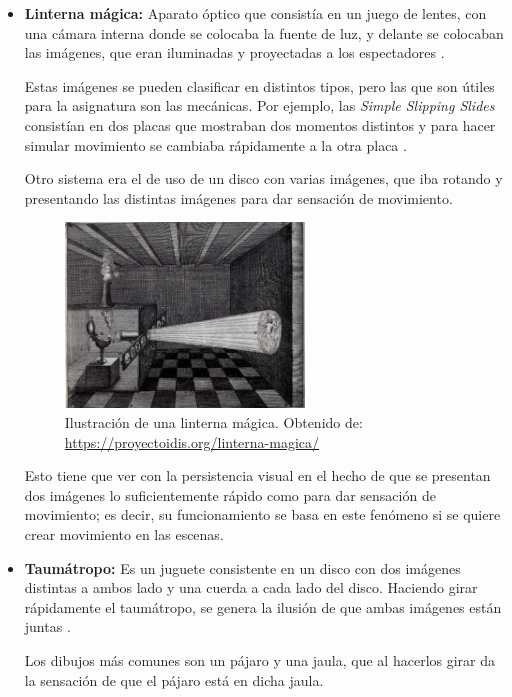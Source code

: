 \documentclass{article}
\begin{document}
\begin{itemize}
    \item \textbf{Linterna mágica: }Aparato óptico que consistía en un juego de lentes, con una cámara interna donde se colocaba la fuente de luz, y delante se colocaban las imágenes, que eran iluminadas y proyectadas a los espectadores \cite{magiclantern}.
    
    Estas imágenes se pueden clasificar en distintos tipos, pero las que son útiles para la asignatura son las mecánicas. Por ejemplo, las \textit{Simple Slipping Slides} consistían en dos placas que mostraban dos momentos distintos y para hacer simular movimiento se cambiaba rápidamente a la otra placa \cite{magiclantern}.


    Otro sistema era el de uso de un disco con varias imágenes, que iba rotando y presentando las distintas imágenes para dar sensación de movimiento.

	\begin{figure}[H]
	    \centering
	    \includegraphics[width=0.6\textwidth]{imagenes/lmagic.jpg}
        \caption{Ilustración de una linterna mágica. Obtenido de: \url{https://proyectoidis.org/linterna-magica/}}
	\end{figure}

    Esto tiene que ver con la persistencia visual en el hecho de que se presentan dos imágenes lo suficientemente rápido como para dar sensación de movimiento; es decir, su funcionamiento se basa en este fenómeno si se quiere crear movimiento en las escenas.

    \item \textbf{Taumátropo: }Es un juguete consistente en un disco con dos imágenes distintas a ambos lado y una cuerda a cada lado del disco. Haciendo girar rápidamente el taumátropo, se genera la ilusión de que ambas imágenes están juntas \cite{tauma}.
    
    Los dibujos más comunes son un pájaro y una jaula, que al hacerlos girar da la sensación de que el pájaro está en dicha jaula.


\end{itemize}
\end{document}
